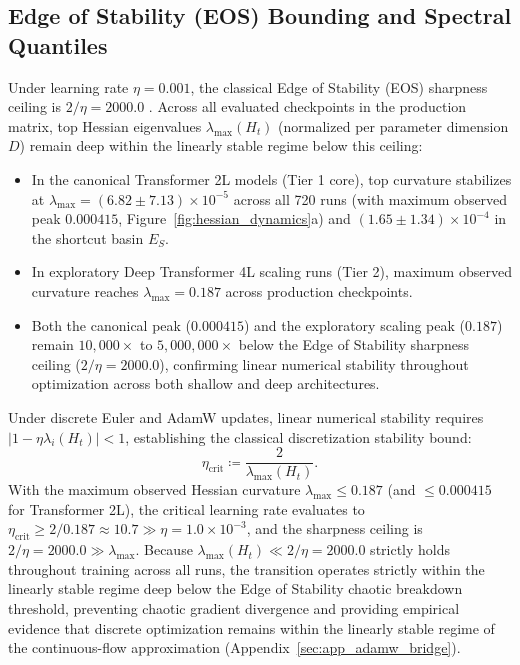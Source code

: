 \documentclass{article}
\theoremstyle{plain}
\theoremstyle{definition}
\begin{document}
\subsection{Edge of Stability (EOS) Bounding and Spectral Quantiles}
Under learning rate $\eta = 0.001$, the classical Edge of Stability (EOS) sharpness ceiling is $2/\eta = 2000.0$ \citep{Cohen2021Gradient}. Across all evaluated checkpoints in the production matrix, top Hessian eigenvalues $\lambda_{\text{max}}(H_t)$ (normalized per parameter dimension $D$) remain deep within the linearly stable regime below this ceiling:
\begin{itemize}[noitemsep]
    \item In the canonical Transformer 2L models (Tier 1 core), top curvature stabilizes at $\lambda_{\text{max}} = (6.82 \pm 7.13) \times 10^{-5}$ across all 720 runs (with maximum observed peak $0.000415$, Figure~\ref{fig:hessian_dynamics}a) and $(1.65 \pm 1.34) \times 10^{-4}$ in the shortcut basin $E_S$.
    \item In exploratory Deep Transformer 4L scaling runs (Tier 2), maximum observed curvature reaches $\lambda_{\text{max}} = 0.187$ across production checkpoints.
    \item Both the canonical peak ($0.000415$) and the exploratory scaling peak ($0.187$) remain $10{,}000\times$ to $5{,}000{,}000\times$ below the Edge of Stability sharpness ceiling ($2/\eta = 2000.0$), confirming linear numerical stability throughout optimization across both shallow and deep architectures.
\end{itemize}
Under discrete Euler and AdamW updates, linear numerical stability requires $|1 - \eta \lambda_i(H_t)| < 1$, establishing the classical discretization stability bound:
\begin{equation}
    \eta_{\text{crit}} \coloneqq \frac{2}{\lambda_{\text{max}}(H_t)}.
    \label{eq:eta_crit}
\end{equation}
With the maximum observed Hessian curvature $\lambda_{\text{max}} \le 0.187$ (and $\le 0.000415$ for Transformer 2L), the critical learning rate evaluates to $\eta_{\text{crit}} \ge 2 / 0.187 \approx 10.7 \gg \eta = 1.0 \times 10^{-3}$, and the sharpness ceiling is $2/\eta = 2000.0 \gg \lambda_{\text{max}}$. Because $\lambda_{\text{max}}(H_t) \ll 2/\eta = 2000.0$ strictly holds throughout training across all runs, the transition operates strictly within the linearly stable regime deep below the Edge of Stability chaotic breakdown threshold, preventing chaotic gradient divergence and providing empirical evidence that discrete optimization remains within the linearly stable regime of the continuous-flow approximation (Appendix~\ref{sec:app_adamw_bridge}).
\end{document}
